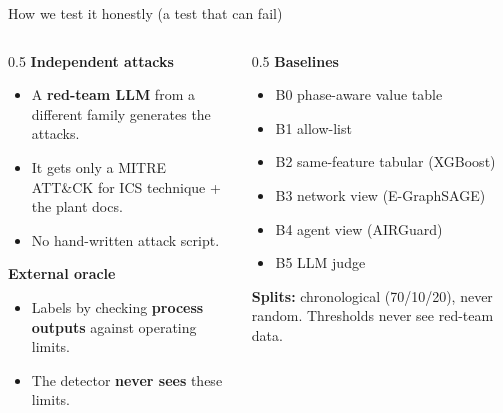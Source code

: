 \documentclass[aspectratio=169]{beamer}
\newcommand{\key}[1]{\textcolor{accent}{\textbf{#1}}}
\newcommand{\warn}[1]{\textcolor{accent2}{\textbf{#1}}}
\begin{document}
\begin{frame}{How we test it honestly (a test that can fail)}
\begin{columns}[T]
\begin{column}{0.5\textwidth}
\textbf{Independent attacks}
\begin{itemize}
  \item A \key{red-team LLM} from a different family generates the attacks.
  \item It gets only a MITRE ATT\&CK for ICS technique + the plant docs.
  \item No hand-written attack script.
\end{itemize}
\vspace{0.4em}
\textbf{External oracle}
\begin{itemize}
  \item Labels by checking \key{process outputs} against operating limits.
  \item The detector \warn{never sees} these limits.
\end{itemize}
\end{column}
\begin{column}{0.5\textwidth}
\textbf{Baselines}
\begin{itemize}
  \item B0 phase-aware value table
  \item B1 allow-list
  \item B2 same-feature tabular (XGBoost)
  \item B3 network view (E-GraphSAGE)
  \item B4 agent view (AIRGuard)
  \item B5 LLM judge
\end{itemize}
\vspace{0.3em}
\textbf{Splits:} chronological (70/10/20), never random. Thresholds never see
red-team data.
\end{column}
\end{columns}
\end{frame}
\end{document}
